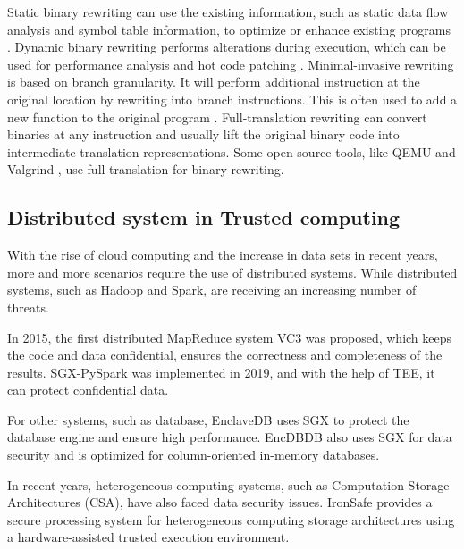 Static binary rewriting can use the existing information, such as static data flow analysis and
symbol table information, to optimize or enhance existing programs \cite{10.1145/2629335, Schwarz2007PLTOAL}. 
Dynamic binary rewriting performs alterations during execution, which can be used for
performance analysis \cite{Luk2005PinBC} and hot code patching \cite{Bruening2003AnIF}.
Minimal-invasive rewriting is based on branch granularity. It will perform additional instruction
at the original location by rewriting into branch instructions. This is often used to add a new
function to the original program \cite{Federico2017revngAU}.
Full-translation rewriting can convert binaries at any instruction and usually lift the original
binary code into intermediate translation representations. Some open-source tools,
like QEMU \cite{Bellard2005QEMUAF} and Valgrind \cite{Nethercote2007ValgrindAF},
use full-translation for binary rewriting.


\subsection{Distributed system in Trusted computing}
With the rise of cloud computing and the increase in data sets in recent years,
more and more scenarios require the use of distributed systems.
While distributed systems, such as Hadoop and Spark, are receiving an increasing number
of threats.

In 2015, the first distributed MapReduce system VC3 \cite{Schuster2015VC3TD} was proposed,
which keeps the code and data confidential, ensures the correctness and completeness of the results.
SGX-PySpark \cite{Quoc2019SGXPySparkSD} was implemented in 2019, and with the help of TEE,
it can protect confidential data.

For other systems, such as database, EnclaveDB \cite{Priebe2018EnclaveDBAS} uses SGX to
protect the database engine and ensure high performance.
EncDBDB \cite{Fuhry2021EncDBDBSE} also uses SGX for data security and is optimized for
column-oriented in-memory databases.

In recent years, heterogeneous computing systems, such as Computation Storage Architectures (CSA), 
have also faced data security issues.
IronSafe \cite{Unnibhavi2022SecureAP} provides a secure processing system for heterogeneous
computing storage architectures using a hardware-assisted trusted execution environment.